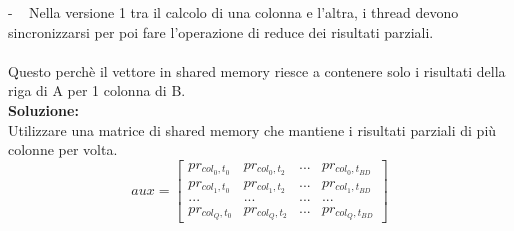 \documentclass[compress]{beamer}
\begin{document}
\begin{frame}{\secname \text{ }- \subsecname\ }
    Nella versione 1 tra il calcolo di una colonna e l'altra, i thread devono sincronizzarsi per poi fare l'operazione di reduce dei risultati parziali. \\ \\
    Questo perchè il vettore in shared memory riesce a contenere solo i risultati della riga di A per 1 colonna di B. \\
    
    \textbf{Soluzione:} \\
    Utilizzare una matrice di shared memory che mantiene i risultati parziali di più colonne per volta.
   \[
        aux = \left[
        \begin{matrix}
        pr_{col_0, t_0} & pr_{col_0, t_2} & ... & pr_{col_0, t_{BD}} \\
        pr_{col_1, t_0} & pr_{col_1, t_2} & ... & pr_{col_1, t_{BD}} \\
        ... & ... & ... & ... \\
        pr_{col_{Q}, t_0} & pr_{col_{Q}, t_2} & ... & pr_{col_{Q}, t_{BD}}
        \end{matrix}\right]
    \]
\end{frame}
\end{document}
